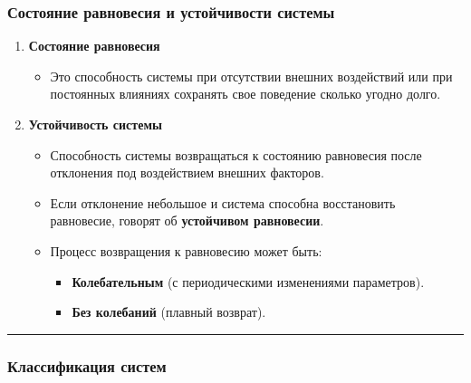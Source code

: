 \documentclass[
]{article}
\providecommand{\tightlist}{%
  \setlength{\itemsep}{0pt}\setlength{\parskip}{0pt}}
\begin{document}
\subsubsection{\texorpdfstring{\textbf{Состояние равновесия и
устойчивости
системы}}{Состояние равновесия и устойчивости системы}}\label{ux441ux43eux441ux442ux43eux44fux43dux438ux435-ux440ux430ux432ux43dux43eux432ux435ux441ux438ux44f-ux438-ux443ux441ux442ux43eux439ux447ux438ux432ux43eux441ux442ux438-ux441ux438ux441ux442ux435ux43cux44b}

\begin{enumerate}
\def\labelenumi{\arabic{enumi}.}
\item
  \textbf{Состояние равновесия}

  \begin{itemize}
  \tightlist
  \item
    Это способность системы при отсутствии внешних воздействий или при
    постоянных влияниях сохранять свое поведение сколько угодно долго.
  \end{itemize}
\item
  \textbf{Устойчивость системы}

  \begin{itemize}
  \tightlist
  \item
    Способность системы возвращаться к состоянию равновесия после
    отклонения под воздействием внешних факторов.
  \item
    Если отклонение небольшое и система способна восстановить
    равновесие, говорят об \textbf{устойчивом равновесии}.
  \item
    Процесс возвращения к равновесию может быть:

    \begin{itemize}
    \tightlist
    \item
      \textbf{Колебательным} (с периодическими изменениями параметров).
    \item
      \textbf{Без колебаний} (плавный возврат).
    \end{itemize}
  \end{itemize}
\end{enumerate}

\begin{center}\rule{0.5\linewidth}{0.5pt}\end{center}

\subsubsection{\texorpdfstring{\textbf{Классификация
систем}}{Классификация систем}}\label{ux43aux43bux430ux441ux441ux438ux444ux438ux43aux430ux446ux438ux44f-ux441ux438ux441ux442ux435ux43c}
\end{document}
